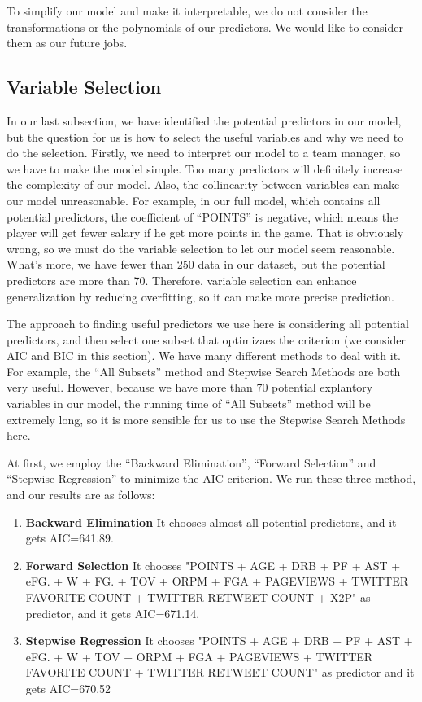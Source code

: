 \documentclass[12pt,]{article}
\begin{document}
To simplify our model and make it interpretable, we do not consider the
transformations or the polynomials of our predictors. We would like to
consider them as our future jobs.

\subsection{Variable Selection}

In our last subsection, we have identified the potential predictors in
our model, but the question for us is how to select the useful variables
and why we need to do the selection. Firstly, we need to interpret our
model to a team manager, so we have to make the model simple. Too many
predictors will definitely increase the complexity of our model. Also,
the collinearity between variables can make our model unreasonable. For
example, in our full model, which contains all potential predictors, the
coefficient of ``POINTS'' is negative, which means the player will get
fewer salary if he get more points in the game. That is obviously wrong,
so we must do the variable selection to let our model seem reasonable.
What's more, we have fewer than 250 data in our dataset, but the
potential predictors are more than 70. Therefore, variable selection can
enhance generalization by reducing overfitting, so it can make more
precise prediction.

The approach to finding useful predictors we use here is considering all
potential predictors, and then select one subset that optimizaes the
criterion (we consider AIC and BIC in this section). We have many
different methods to deal with it. For example, the ``All Subsets''
method and Stepwise Search Methods are both very useful. However,
because we have more than 70 potential explantory variables in our
model, the running time of ``All Subsets'' method will be extremely
long, so it is more sensible for us to use the Stepwise Search Methods
here.

At first, we employ the ``Backward Elimination'', ``Forward Selection''
and ``Stepwise Regression'' to minimize the AIC criterion. We run these
three method, and our results are as follows:

\begin{enumerate}
\item \textbf{Backward Elimination} It chooses almost all potential predictors, and it gets AIC=641.89.
\item \textbf{Forward Selection} It chooses "POINTS + AGE + DRB + PF + AST + eFG. + W + FG. + TOV + ORPM + FGA + PAGEVIEWS + TWITTER FAVORITE COUNT + TWITTER RETWEET COUNT + X2P" as predictor, and it gets AIC=671.14.
\item \textbf{Stepwise Regression} It chooses "POINTS + AGE + DRB + PF + AST + eFG. + W + TOV + ORPM + FGA + PAGEVIEWS + TWITTER FAVORITE COUNT + TWITTER RETWEET COUNT" as predictor and it gets AIC=670.52
\end{enumerate}
\end{document}
